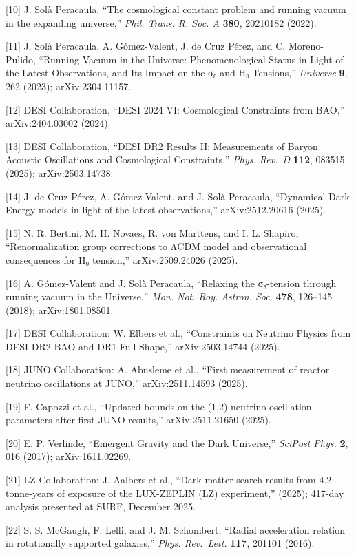 \documentclass[
]{article}
\begin{document}
{[}10{]} J. Solà Peracaula, ``The cosmological constant problem and
running vacuum in the expanding universe,'' \emph{Phil. Trans. R. Soc.
A} \textbf{380}, 20210182 (2022).

{[}11{]} J. Solà Peracaula, A. Gómez-Valent, J. de Cruz Pérez, and C.
Moreno-Pulido, ``Running Vacuum in the Universe: Phenomenological Status
in Light of the Latest Observations, and Its Impact on the σ₈ and H₀
Tensions,'' \emph{Universe} \textbf{9}, 262 (2023); arXiv:2304.11157.

{[}12{]} DESI Collaboration, ``DESI 2024 VI: Cosmological Constraints
from BAO,'' arXiv:2404.03002 (2024).

{[}13{]} DESI Collaboration, ``DESI DR2 Results II: Measurements of
Baryon Acoustic Oscillations and Cosmological Constraints,'' \emph{Phys.
Rev.~D} \textbf{112}, 083515 (2025); arXiv:2503.14738.

{[}14{]} J. de Cruz Pérez, A. Gómez-Valent, and J. Solà Peracaula,
``Dynamical Dark Energy models in light of the latest observations,''
arXiv:2512.20616 (2025).

{[}15{]} N. R. Bertini, M. H. Novaes, R. von Marttens, and I. L.
Shapiro, ``Renormalization group corrections to ΛCDM model and
observational consequences for H₀ tension,'' arXiv:2509.24026 (2025).

{[}16{]} A. Gómez-Valent and J. Solà Peracaula, ``Relaxing the
σ₈-tension through running vacuum in the Universe,'' \emph{Mon. Not.
Roy. Astron. Soc.} \textbf{478}, 126--145 (2018); arXiv:1801.08501.

{[}17{]} DESI Collaboration: W. Elbers et al., ``Constraints on Neutrino
Physics from DESI DR2 BAO and DR1 Full Shape,'' arXiv:2503.14744 (2025).

{[}18{]} JUNO Collaboration: A. Abusleme et al., ``First measurement of
reactor neutrino oscillations at JUNO,'' arXiv:2511.14593 (2025).

{[}19{]} F. Capozzi et al., ``Updated bounds on the (1,2) neutrino
oscillation parameters after first JUNO results,'' arXiv:2511.21650
(2025).

{[}20{]} E. P. Verlinde, ``Emergent Gravity and the Dark Universe,''
\emph{SciPost Phys.} \textbf{2}, 016 (2017); arXiv:1611.02269.

{[}21{]} LZ Collaboration: J. Aalbers et al., ``Dark matter search
results from 4.2 tonne-years of exposure of the LUX-ZEPLIN (LZ)
experiment,'' (2025); 417-day analysis presented at SURF, December 2025.

{[}22{]} S. S. McGaugh, F. Lelli, and J. M. Schombert, ``Radial
acceleration relation in rotationally supported galaxies,'' \emph{Phys.
Rev.~Lett.} \textbf{117}, 201101 (2016).
\end{document}
